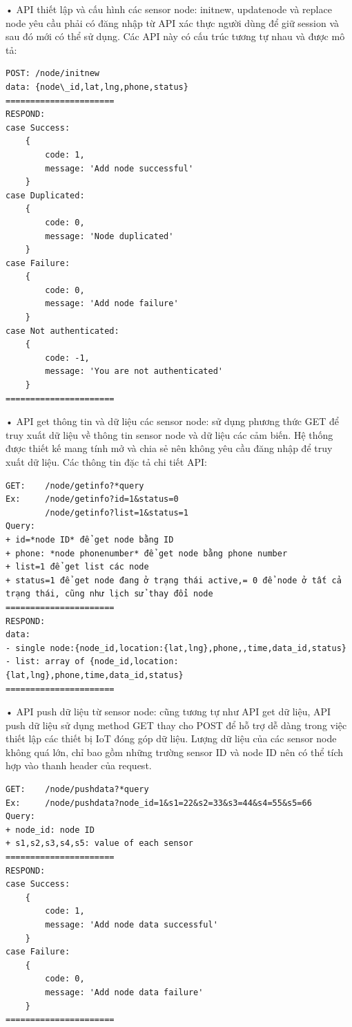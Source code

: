 • API thiết lập và cấu hình các sensor node: initnew, updatenode và replace node yêu cầu phải có đăng nhập từ API xác thực người dùng để giữ session và sau đó mới có thể sử dụng. Các API này có cấu trúc tương tự nhau và được mô tả:
\begin{Verbatim}[xleftmargin=2em]
POST: /node/initnew
data: {node\_id,lat,lng,phone,status}
======================
RESPOND:
case Success:
	{
		code: 1,
		message: 'Add node successful'
	}
case Duplicated:
	{
		code: 0,
		message: 'Node duplicated'
	}
case Failure:
	{
		code: 0,
		message: 'Add node failure'
	}
case Not authenticated:
	{
		code: -1,
		message: 'You are not authenticated'
	}
======================	
\end{Verbatim}

• API get thông tin và dữ liệu các sensor node: sử dụng phương thức GET để truy xuất dữ liệu về thông tin sensor node và dữ liệu các cảm biến. Hệ thống được thiết kế mang tính mở và chia sẻ nên không yêu cầu đăng nhập để truy xuất dữ liệu. Các thông tin đặc tả chi tiết API:
\begin{Verbatim}[xleftmargin=2em]
GET:	/node/getinfo?*query
Ex: 	/node/getinfo?id=1&status=0
	    /node/getinfo?list=1&status=1
Query:
+ id=*node ID* để get node bằng ID
+ phone: *node phonenumber* để get node bằng phone number
+ list=1 để get list các node
+ status=1 để get node đang ở trạng thái active,= 0 để node ở tất cả 
trạng thái, cũng như lịch sử thay đổi node
======================
RESPOND:
data:
- single node:{node_id,location:{lat,lng},phone,,time,data_id,status}
- list: array of {node_id,location:{lat,lng},phone,time,data_id,status}
======================
\end{Verbatim}

• API push dữ liệu từ sensor node: cũng tương tự như API get dữ liệu, API push dữ liệu sử dụng method GET thay cho POST để hỗ trợ dễ dàng trong việc thiết lập các thiết bị IoT đóng góp dữ liệu. Lượng dữ liệu của các sensor node không quá lớn, chỉ bao gồm những trường sensor ID và node ID nên có thể tích hợp vào thanh header của request.

\begin{Verbatim}[xleftmargin=2em]
GET: 	/node/pushdata?*query
Ex: 	/node/pushdata?node_id=1&s1=22&s2=33&s3=44&s4=55&s5=66
Query:
+ node_id: node ID
+ s1,s2,s3,s4,s5: value of each sensor
======================
RESPOND:
case Success:
	{
		code: 1,
		message: 'Add node data successful'
	}
case Failure:	
	{
		code: 0,
		message: 'Add node data failure'
	}
======================
\end{Verbatim}

